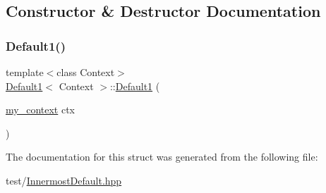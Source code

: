 \subsection{Constructor \& Destructor Documentation}
\mbox{\label{struct_default1_ab8f12bb5672dacc6a41df3000d9c19de}} 
\subsubsection{\texorpdfstring{Default1()}{Default1()}}
{\footnotesize\ttfamily template$<$class Context$>$ \\
\mbox{\hyperlink{struct_default1}{Default1}}$<$ Context $>$\+::\mbox{\hyperlink{struct_default1}{Default1}} (\begin{DoxyParamCaption}\item[{\mbox{\hyperlink{struct_default1_a92f8ed76bf3688622a87155b17e4fccf}{my\+\_\+context}}}]{ctx }\end{DoxyParamCaption})\hspace{0.3cm}{\ttfamily [inline]}}



The documentation for this struct was generated from the following file\+:\begin{DoxyCompactItemize}
\item 
test/\mbox{\hyperlink{_innermost_default_8hpp}{Innermost\+Default.\+hpp}}\end{DoxyCompactItemize}
